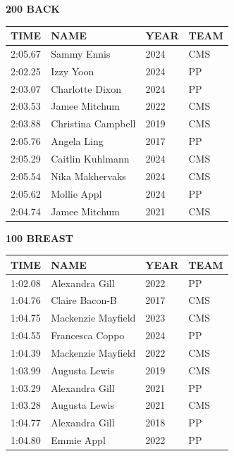 \begin{table}[H]
\centering
\begin{minipage}[t]{0.48\textwidth}
\centering
\textbf{200 BACK}\\[0.1cm]
\begin{tabular}{@{}p{1.8cm}p{2.8cm}p{1.2cm}p{1.4cm}@{}}
\hline
    \textbf{TIME} & \textbf{NAME} & \textbf{YEAR} & \textbf{TEAM} \\
\hline
    2:05.67 & Sammy Ennis & 2024 & CMS \\
    2:02.25 & Izzy Yoon & 2024 & PP \\
    2:03.07 & Charlotte Dixon & 2024 & PP \\
    2:03.53 & Jamee Mitchum & 2022 & CMS \\
    2:03.88 & Christina Campbell & 2019 & CMS \\
    2:05.76 & Angela Ling & 2017 & PP \\
    2:05.29 & Caitlin Kuhlmann & 2024 & CMS \\
    2:05.54 & Nika Makhervaks & 2024 & CMS \\
    2:05.62 & Mollie Appl & 2024 & PP \\
    2:04.74 & Jamee Mitchum & 2021 & CMS \\
\hline
\end{tabular}
\end{minipage}\hfill
\begin{minipage}[t]{0.48\textwidth}
\centering
\textbf{100 BREAST}\\[0.1cm]
\begin{tabular}{@{}p{1.8cm}p{2.8cm}p{1.2cm}p{1.4cm}@{}}
\hline
    \textbf{TIME} & \textbf{NAME} & \textbf{YEAR} & \textbf{TEAM} \\
\hline
    1:02.08 & Alexandra Gill & 2022 & PP \\
    1:04.76 & Claire Bacon-B & 2017 & CMS \\
    1:04.75 & Mackenzie Mayfield & 2023 & CMS \\
    1:04.55 & Francesca Coppo & 2024 & PP \\
    1:04.39 & Mackenzie Mayfield & 2022 & CMS \\
    1:03.99 & Augusta Lewis & 2019 & CMS \\
    1:03.29 & Alexandra Gill & 2021 & PP \\
    1:03.28 & Augusta Lewis & 2021 & CMS \\
    1:04.77 & Alexandra Gill & 2018 & PP \\
    1:04.80 & Emmie Appl & 2022 & PP \\
\hline
\end{tabular}
\end{minipage}
\end{table}

